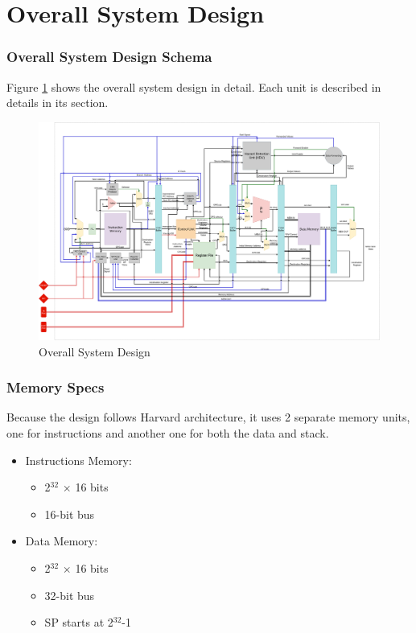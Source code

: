 \documentclass[12pt]{report}
\begin{document}
\part{Overall System Design}
\section{Overall System Design Schema}
Figure \ref{fig:overall} shows the overall system design in detail. Each unit is described in details in its section.
\begin{center}
    \begin{figure}[hp]
        \centering
        \includegraphics[width=\textwidth]{images/overall_system}
        \caption{Overall System Design}
        \label{fig:overall}
    \end{figure}
\end{center}

\section{Memory Specs}
Because the design follows Harvard architecture, it uses 2 separate memory units, one for instructions and another one for both the data and stack.
\begin{itemize}
    \item Instructions Memory:
    \begin{itemize}
        \item 2$^{32}$ $\times$ 16 bits
        \item 16-bit bus
    \end{itemize}
    \item Data Memory:
    \begin{itemize}
        \item 2$^{32}$ $\times$ 16 bits
        \item 32-bit bus
        \item SP starts at 2$^{32}$-1
    \end{itemize}
\end{itemize}
\end{document}
